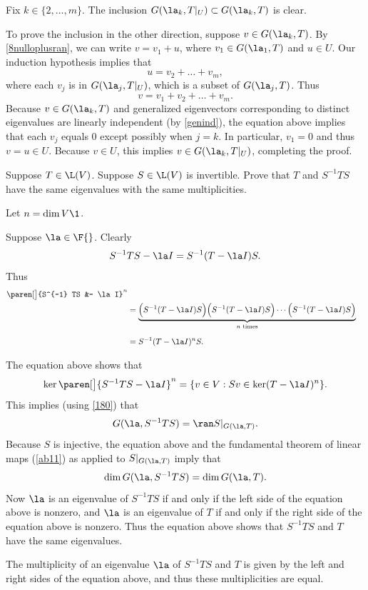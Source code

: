 \begin{Solution}
Fix $k \in \{2, \dots, m\}$. The inclusion $G(\la_k, T|_U) \subset G(\la_k, T)$ is clear.

To prove the inclusion in the other direction, suppose $v \in G(\la_k, T)$. By \ref{8nulloplusran}, we can write $v = v_1 + u$, where $v_1 \in G(\la_1, T)$ and $u \in U$. Our induction hypothesis implies that
\[
u = v_2 + \dots + v_m,
\]
where each $v_j$ is in $G(\la_j, T|_U)$, which is a subset of $G(\la_j, T)$. Thus
\[
v = v_1 + v_2 + \dots + v_m.
\]
Because $v \in G(\la_k, T)$ and generalized eigenvectors corresponding to distinct eigenvalues are linearly independent (by \ref{genind}), the equation above implies that each $v_j$ equals $0$ except possibly when $j = k$. In particular, $v_1 = 0$ and thus $v = u \in U$. Because $v \in U$, this implies $v \in G(\la_k, T|_U)$, completing the proof.
\end{Solution}

\exercise
Suppose $T \in \L(V)$.  Suppose $S \in \L(V)$ is invertible. Prove that $T$ and $S^{-1} T S$ have the same eigenvalues with the same multiplicities.

\begin{Solution}
Let $n = \dim V\1$.

Suppose $\la \in \F{}$.  Clearly
\[
S^{-1} TS - \la I = S^{-1}(T - \la I)S.
\]
Thus
\begin{align*}
\paren[\big]{S^{-1} TS &- \la I}^n \\
&= \underbrace{\Big( S^{-1}(T - \la I) S \Bigr) \Big( S^{-1}(T - \la I) S \Bigr)\dotsm \Big( S^{-1}(T - \la I) S \Bigr)}_{n\text{ times}} \\[6bp]
&= S^{-1} (T - \la I)^n S.
\end{align*}

The equation above shows that
\[
\ker \paren[\big]{S^{-1} T S - \la I}^n = \{ v \in V : S v \in \ker (T - \la I)^n\}.
\]
This implies (using \ref{180}) that
\[
G(\la, S^{-1} T S) = \ran S|_{G(\la, T)}.
\]
Because $S$ is injective, the equation above and the fundamental theorem of linear maps (\ref{ab11}) as applied to $S|_{G(\la, T)}$ imply that
\[
\dim G(\la, S^{-1} T S) = \dim G(\la, T).
\]
Now $\la$ is an eigenvalue of $S^{-1}TS$ if and only if the left side of the equation above is nonzero, and $\la$ is an eigenvalue of $T$ if and only if the right side of the equation above is nonzero. Thus the equation above shows that $S^{-1}TS$ and $T$ have the same eigenvalues.

The multiplicity of an eigenvalue $\la$ of $S^{-1}TS$ and $T$ is given by the left and right sides of the equation above, and thus these multiplicities are equal.
\end{Solution}

